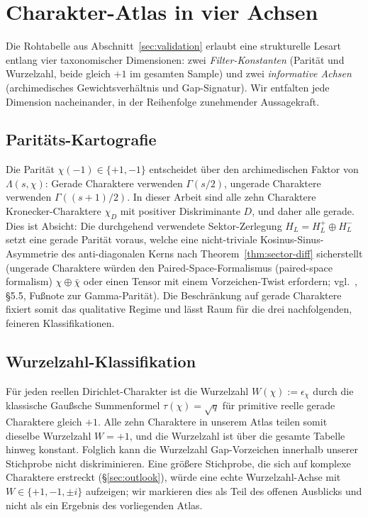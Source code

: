 \documentclass[a4paper,10pt,twocolumn]{article}
\theoremstyle{definition}
\theoremstyle{remark}
\newcommand{\chifn}{\chi}
\begin{document}
\section{Charakter-Atlas in vier Achsen}
\label{sec:atlas}

Die Rohtabelle aus Abschnitt~\ref{sec:validation} erlaubt eine strukturelle
Lesart entlang vier taxonomischer Dimensionen: zwei \emph{Filter-Konstanten}
(Parität und Wurzelzahl, beide gleich $+1$ im gesamten Sample) und zwei
\emph{informative Achsen} (archimedisches Gewichtsverhältnis und Gap-Signatur).
Wir entfalten jede Dimension nacheinander, in der Reihenfolge zunehmender
Aussagekraft.

\subsection{Paritäts-Kartografie}
\label{sec:parity}

Die Parität $\chifn(-1)\in\{+1,-1\}$ entscheidet über den archimedischen Faktor von
$\Lambda(s,\chifn)$: Gerade Charaktere verwenden $\Gamma(s/2)$, ungerade
Charaktere verwenden $\Gamma((s+1)/2)$. In dieser Arbeit sind alle zehn Charaktere
Kronecker-Charaktere $\chifn_D$ mit positiver Diskriminante $D$, und
daher alle gerade. Dies ist Absicht: Die durchgehend verwendete Sektor-Zerlegung
$H_L=H_L^+\oplus H_L^-$ setzt eine gerade Parität voraus, welche
eine nicht-triviale Kosinus-Sinus-Asymmetrie des anti-diagonalen Kerns
nach Theorem~\ref{thm:sector-diff} sicherstellt (ungerade Charaktere würden
den Paired-Space-Formalismus (paired-space formalism)
$\chifn\oplus\bar\chifn$ oder einen Tensor mit einem Vorzeichen-Twist erfordern; vgl.\
\cite{MetaGalerkinBridge}, \S5.5, Fußnote zur Gamma-Parität). Die
Beschränkung auf gerade Charaktere fixiert somit das qualitative Regime und lässt Raum
für die drei nachfolgenden, feineren Klassifikationen.

\subsection{Wurzelzahl-Klassifikation}
\label{sec:rootnumber}

Für jeden reellen Dirichlet-Charakter ist die Wurzelzahl $W(\chifn):=
\epsilon_{\chifn}$ durch die klassische Gaußsche Summenformel
$\tau(\chifn)=\sqrt{q}$ für primitive reelle gerade Charaktere \cite{IwaniecKowalski}
gleich $+1$. Alle zehn Charaktere in unserem Atlas teilen somit
dieselbe Wurzelzahl $W=+1$, und die Wurzelzahl ist über die gesamte Tabelle
hinweg konstant. Folglich kann die Wurzelzahl Gap-Vorzeichen
innerhalb unserer Stichprobe nicht diskriminieren. Eine größere Stichprobe, die sich auf komplexe
Charaktere erstreckt (\S\ref{sec:outlook}), würde eine echte Wurzelzahl-Achse
mit $W\in\{+1,-1,\pm i\}$ aufzeigen; wir markieren dies als Teil des offenen
Ausblicks und nicht als ein Ergebnis des vorliegenden Atlas.
\end{document}
